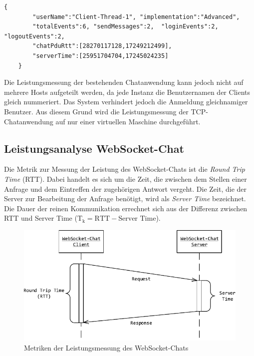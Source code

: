 \documentclass[11pt,a4paper,titlepage]{scrartcl}
\numberwithin{equation}{section}
\begin{document}
\begin{lstlisting}[frame=single, caption=Resultat eines Benchmark-Clients, label=lst:evalJSONResultat]
	{
		"userName":"Client-Thread-1", "implementation":"Advanced",
		"totalEvents":6, "sendMessages":2,	"loginEvents":2, "logoutEvents":2,
		"chatPduRtt":[28270117128,17249212499],
		"serverTime":[25951704704,17245024235]
	}
\end{lstlisting}

\noindent Die Leistungsmessung der bestehenden Chatanwendung kann jedoch nicht auf mehrere Hosts aufgeteilt werden, da jede Instanz die Benutzernamen der Clients gleich nummeriert. Das System verhindert jedoch die Anmeldung gleichnamiger Benutzer. Aus diesem Grund wird die Leistungsmessung der TCP-Chatanwendung auf nur einer virtuellen Maschine durchgeführt.

\subsection{Leistungsanalyse WebSocket-Chat} \label{subsec:Benchmark}
Die Metrik zur Messung der Leistung des WebSocket-Chats ist die \textit{Round Trip Time} (RTT). Dabei handelt es sich um die Zeit, die zwischen dem Stellen einer Anfrage und dem Eintreffen der zugehörigen Antwort vergeht. Die Zeit, die der Server zur Bearbeitung der Anfrage benötigt, wird als \textit{Server Time} bezeichnet. Die Dauer der reinen Kommunikation errechnet sich aus der Differenz zwischen RTT und Server Time ($ \text{T}_{\text{k}} = \text{RTT}-\text{Server Time} $).
\medskip
\begin{figure}[ht] 
	\begin{center}
		\includegraphics[scale=1.0]{img/rtt.pdf}
		\caption{Metriken der Leistungsmessung des WebSocket-Chats}
		\label{fig:RTT}
	\end{center}
\end{figure}
\end{document}
